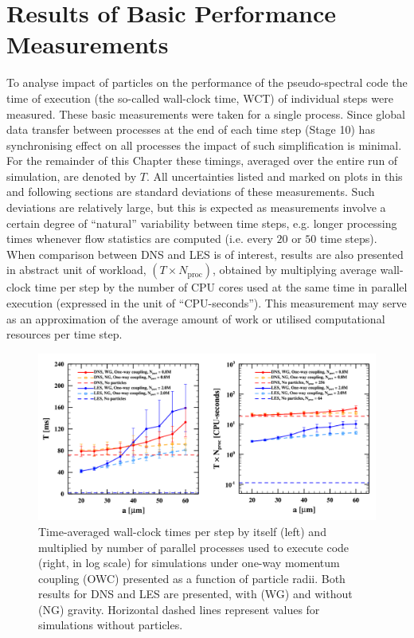 \documentclass{pracamgren}
\begin{document}
\section{Results of Basic Performance Measurements}
\label{sc:ch3.perfs}

To analyse impact of particles on the performance of the pseudo-spectral code the time of execution (the so-called wall-clock time, WCT) of individual steps were measured.
These basic measurements were taken for a single process.
Since global data transfer between processes at the end of each time step (Stage 10) has synchronising effect on all processes the impact of such simplification is minimal.
For the remainder of this Chapter these timings, averaged over the entire run of simulation, are denoted by $T$.
All uncertainties listed and marked on plots in this and following sections are standard deviations of these measurements.
Such deviations are relatively large, but this is expected as measurements involve a certain degree of ``natural'' variability between time steps, e.g. longer processing times whenever flow statistics are computed (i.e. every $20$ or $50$ time steps).
When comparison between DNS and LES is of interest, results are also presented in abstract unit of workload, $(T \times N_{\text{proc}})$, obtained by multiplying average wall-clock time per step by the number of CPU cores used at the same time in parallel execution (expressed in the unit of ``CPU-seconds'').
This measurement may serve as an approximation of the average amount of work or utilised computational resources per time step.

\begin{figure}[h]
\centering
\includegraphics[width=13.5cm]{figures/3-02_pfsowc.pdf}
\caption{
Time-averaged wall-clock times per step by itself (left) and multiplied by number of parallel processes used to execute code (right, in log scale) for simulations under one-way momentum coupling (OWC) presented as a function of particle radii.
Both results for DNS and LES are presented, with (WG) and without (NG) gravity.
Horizontal dashed lines represent values for simulations without particles.
}
\label{fig:pfsowc}
\end{figure}
\end{document}
